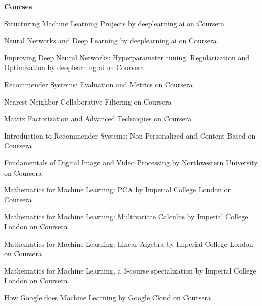   \begin{cventries}

 \cventry
 {\bf Courses}
 {}
 {}
 {}
    {
      \begin{cvitems} %
        \item {Structuring Machine Learning Projects by deeplearning.ai on Coursera}
        \item {Neural Networks and Deep Learning by deeplearning.ai on Coursera}
        \item {Improving Deep Neural Networks: Hyperparameter tuning, Regularization and Optimization by deeplearning.ai on Coursera}
        \item {Recommender Systems: Evaluation and Metrics on Coursera}
        \item {Nearest Neighbor Collaborative Filtering on Coursera}
        \item {Matrix Factorization and Advanced Techniques on Coursera}
        \item {Introduction to Recommender Systems: Non-Personalized and Content-Based  on Coursera}
        \item {Fundamentals of Digital Image and Video Processing by Northwestern University on Coursera}
        \item {Mathematics for Machine Learning: PCA by Imperial College London on Coursera}
        \item {Mathematics for Machine Learning: Multivariate Calculus by Imperial College London on Coursera}
        \item {Mathematics for Machine Learning: Linear Algebra by Imperial College London on Coursera}
        \item {Mathematics for Machine Learning, a 3-course specialization by Imperial College London on Coursera}
        \item {How Google does Machine Learning by Google Cloud on Coursera}
      \end{cvitems}
    }

\end{cventries}
